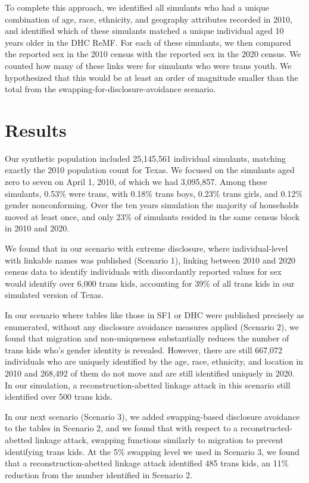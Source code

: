\documentclass{jpc} %
\theoremstyle{plain}\newtheorem{satz}[thm]{Satz} %
\begin{document}
To complete this approach, we identified all simulants who had a unique combination of age, race, ethnicity, and geography attributes recorded in 2010, and identified which of these simulants matched a unique individual aged 10 years older in the DHC ReMF.  For each of these simulants, we then compared the reported sex in the 2010 census with the reported sex in the 2020 census. We counted how many of these links were for simulants who were trans youth.  We hypothesized that this would be at least an order of magnitude smaller than the total from the swapping-for-disclosure-avoidance scenario.

\section*{Results}

Our synthetic population included 25,145,561 individual simulants, matching exactly the 2010 population count for Texas.  We focused on the simulants aged zero to seven on April 1, 2010, of which we had 3,095,857.
Among these simulants, 0.53\% were trans, with 0.18\% trans boys, 0.23\% trans girls, and 0.12\% gender nonconforming.
Over the ten years simulation the majority of households moved at least once, and only 23\% of simulants resided in the same census block in 2010 and 2020.

We found that in our scenario with extreme disclosure, where individual-level with linkable names was published (Scenario 1), linking between 2010 and 2020 census data to identify individuals with discordantly reported values for sex would identify over 6,000 trans kids, accounting for 39\% of all trans kids in our simulated version of Texas.

In our scenario where tables like those in SF1 or DHC were published precisely as enumerated, without any disclosure avoidance measures applied (Scenario 2), we found that migration and non-uniqueness substantially reduces the number of trans kids who's gender identity is revealed.  However, there are still 667,072 individuals who are uniquely identified by the age, race, ethnicity, and location in 2010 and 268,492 of them do not move and are still identified uniquely in 2020.  In our simulation, a reconstruction-abetted linkage attack in this scenario still identified over 500 trans kids.

In our next scenario (Scenario 3), we added swapping-based disclosure avoidance to the tables in Scenario 2, and we found that with respect to a reconstructed-abetted linkage attack, swapping functions similarly to migration to prevent identifying trans kids.  At the 5\% swapping level we used in Scenario 3, we found that a reconstruction-abetted linkage attack identified 485 trans kids, an 11\% reduction from the number identified in Scenario 2.
\end{document}
